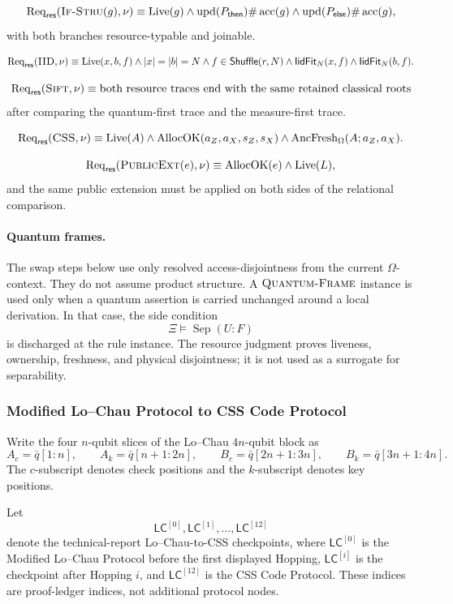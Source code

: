 \documentclass{report}
\theoremstyle{defn_style}
\providecommand{\Live}{\operatorname{Live}}
\providecommand{\AllocOK}{\operatorname{AllocOK}}
\providecommand{\Req}{\operatorname{Req}_{\mathsf{res}}}
\providecommand{\acc}{\operatorname{acc}}
\providecommand{\upd}{\operatorname{upd}}
\providecommand{\HopLC}[1]{\mathsf{LC}^{[#1]}}
\begin{document}
\[
\Req(\textsc{If-Stru}(g),\nu)
\equiv
\Live(g)
\land
\upd(P_{\mathsf{then}})\#\acc(g)
\land
\upd(P_{\mathsf{else}})\#\acc(g),
\]
with both branches resource-typable and joinable.

\[
\Req(\textsc{IID},\nu)
\equiv
\Live(x,b,f)
\land |x|=|b|=N
\land
f\in\mathsf{Shuffle}(r,N)
\land
\mathsf{IidFit}_N(x,f)
\land
\mathsf{IidFit}_N(b,f).
\]

\[
\Req(\textsc{Sift},\nu)
\equiv
\text{both resource traces end with the same retained classical roots}
\]
after comparing the quantum-first trace and the measure-first trace.

\[
\Req(\textsc{CSS},\nu)
\equiv
\Live(A)\land\AllocOK(a_Z,a_X,s_Z,s_X)
\land
\operatorname{AncFresh}_{\Omega}(A;a_Z,a_X).
\]

\[
\Req(\textsc{PublicExt}(e),\nu)
\equiv
\AllocOK(e)\land\Live(L),
\]
and the same public extension must be applied on both sides of the relational
comparison.

\paragraph{Quantum frames.}
The swap steps below use only resolved access-disjointness from the current
\(\Omega\)-context.  They do not assume product structure.  A
\(\textsc{Quantum-Frame}\) instance is used only when a quantum assertion is
carried unchanged around a local derivation.  In that case, the side condition
\[
  \Xi\models \operatorname{Sep}(U:F)
\]
is discharged at the rule instance.  The resource judgment proves liveness,
ownership, freshness, and physical disjointness; it is not used as a surrogate
for separability.

\subsubsection{Modified Lo--Chau Protocol to CSS Code Protocol}
\label{subsubsec:lc-css-resource-certified-ledger-final}

Write the four \(n\)-qubit slices of the Lo--Chau \(4n\)-qubit block as
\[
  A_c=\bar q[1{:}n],
  \qquad
  A_k=\bar q[n+1{:}2n],
  \qquad
  B_c=\bar q[2n+1{:}3n],
  \qquad
  B_k=\bar q[3n+1{:}4n].
\]
The \(c\)-subscript denotes check positions and the \(k\)-subscript denotes key
positions.

Let
\[
  \HopLC{0},\HopLC{1},\ldots,\HopLC{12}
\]
denote the technical-report Lo--Chau-to-CSS checkpoints, where
\(\HopLC{0}\) is the Modified Lo--Chau Protocol before the first displayed
Hopping, \(\HopLC{i}\) is the checkpoint after Hopping \(i\), and
\(\HopLC{12}\) is the CSS Code Protocol.  These indices are proof-ledger
indices, not additional protocol nodes.
\end{document}
